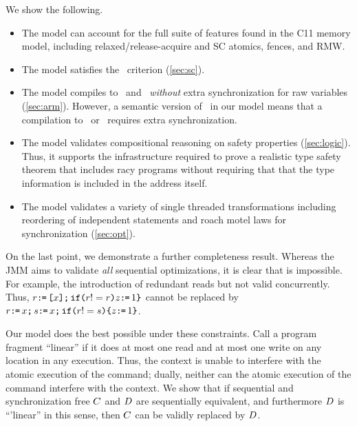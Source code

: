 We show the following.
\begin{itemize}
\item The model can account for the full suite of features found in the C11 memory model, including relaxed/release-acquire and SC atomics, fences, and RMW.

\item The model satisfies the \drfsc\ criterion  (\textsection\ref{sec:sc}).

\item The model compiles to \armeight\ and \tso\ {\em without} extra synchronization for raw variables  (\textsection\ref{sec:arm}).
However, a semantic version of \mca\ in our model means that a compilation to \armseven\ or \ppc\ requires extra synchronization.  

\item The model validates compositional reasoning on safety properties (\textsection\ref{sec:logic}).  Thus, it supports the infrastructure required to prove a realistic type safety theorem that includes racy programs without requiring that that the type information is included in the address itself.

\item The model validates a variety of single threaded transformations including reordering of independent statements and roach motel laws for synchronization  (\textsection\ref{sec:opt}).
\end{itemize}
On the last point, we demonstrate a further completeness result.  Whereas the JMM aims to validate {\em all} sequential optimizations, it is clear that is impossible.  For example, the introduction of redundant reads  but not valid concurrently. Thus, $r \texttt{:}\mkern-1mu\texttt{=}\, \texttt{[}x\texttt{]} \texttt{;}\,\allowbreak \texttt{if}\allowbreak\texttt{(}r != r\texttt{)} z \texttt{:}\mkern-1mu\texttt{=}\, 1 \texttt{\}}$ cannot be replaced by $r \texttt{:}\mkern-1mu\texttt{=}\, x \texttt{;}\,\allowbreak s \texttt{:}\mkern-1mu\texttt{=}\, x  \texttt{;}\,\allowbreak 
\texttt{if}\allowbreak\texttt{(}r != s\texttt{)} \allowbreak\texttt{\{} z \texttt{:}\mkern-1mu\texttt{=}\, 1 \texttt{\}}$.  


Our model does the best possible under these constraints.   Call a program fragment ``linear'' if it does at most one read and at most one write on any location in any execution.  Thus, the context is unable to interfere with the atomic execution of the command; dually, neither can the atomic execution of the command interfere with the context.  We show that if sequential and synchronization free $C$ and $D$ are sequentially equivalent, and furthermore $D$ is ``'linear'' in this sense, then $C$ can be validly replaced by $D$.  




